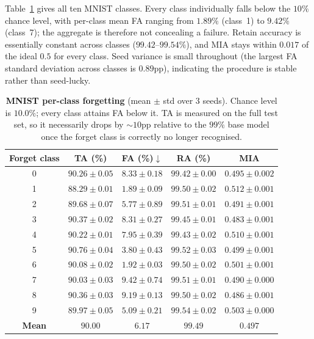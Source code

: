 \documentclass{article}
\theoremstyle{remark}
\theoremstyle{plain}
\begin{document}
Table~\ref{tab:app_mnist} gives all ten MNIST classes. Every class individually
falls below the $10\%$ chance level, with per-class mean FA ranging from
$1.89\%$ (class~1) to $9.42\%$ (class~7); the aggregate is therefore not
concealing a failure. Retain accuracy is essentially constant across classes
($99.42$--$99.54\%$), and MIA stays within $0.017$ of the ideal $0.5$ for every
class. Seed variance is small throughout (the largest FA standard deviation
across classes is $0.89$pp), indicating the procedure is stable rather than
seed-lucky.

\begin{table}[t]
\centering
\caption{\textbf{MNIST per-class forgetting} (mean $\pm$ std over 3 seeds).
Chance level is $10.0\%$; every class attains FA below it. TA is measured on the
full test set, so it necessarily drops by ${\sim}10$pp relative to the
$99\%$ base model once the forget class is correctly no longer recognised.}
\label{tab:app_mnist}
\begin{tabular}{@{}ccccc@{}}
\toprule
Forget class & TA (\%) & FA (\%)$\downarrow$ & RA (\%) & MIA \\
\midrule
0 & $90.26 \pm 0.05$ & $8.33 \pm 0.18$ & $99.42 \pm 0.00$ & $0.495 \pm 0.002$ \\
1 & $88.29 \pm 0.01$ & $1.89 \pm 0.09$ & $99.50 \pm 0.02$ & $0.512 \pm 0.001$ \\
2 & $89.68 \pm 0.07$ & $5.77 \pm 0.89$ & $99.51 \pm 0.01$ & $0.491 \pm 0.001$ \\
3 & $90.37 \pm 0.02$ & $8.31 \pm 0.27$ & $99.45 \pm 0.01$ & $0.483 \pm 0.001$ \\
4 & $90.22 \pm 0.01$ & $7.95 \pm 0.39$ & $99.43 \pm 0.02$ & $0.510 \pm 0.001$ \\
5 & $90.76 \pm 0.04$ & $3.80 \pm 0.43$ & $99.52 \pm 0.03$ & $0.499 \pm 0.001$ \\
6 & $90.08 \pm 0.02$ & $1.92 \pm 0.03$ & $99.50 \pm 0.02$ & $0.501 \pm 0.001$ \\
7 & $90.03 \pm 0.03$ & $9.42 \pm 0.74$ & $99.51 \pm 0.01$ & $0.490 \pm 0.000$ \\
8 & $90.36 \pm 0.03$ & $9.19 \pm 0.13$ & $99.50 \pm 0.02$ & $0.486 \pm 0.001$ \\
9 & $89.97 \pm 0.05$ & $5.09 \pm 0.21$ & $99.54 \pm 0.02$ & $0.503 \pm 0.000$ \\
\midrule
\textbf{Mean} & $\mathbf{90.00}$ & $\mathbf{6.17}$ & $\mathbf{99.49}$ & $\mathbf{0.497}$ \\
\bottomrule
\end{tabular}
\end{table}
\end{document}
